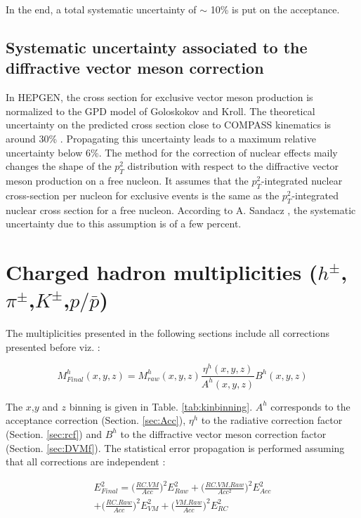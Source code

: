 In the end, a total systematic uncertainty of $\sim$ 10\% is put on the acceptance.


\subsection{Systematic uncertainty associated to the diffractive vector meson correction}

In HEPGEN, the cross section for exclusive vector meson production is normalized to the GPD model of Goloskokov and Kroll. The theoretical uncertainty on the predicted cross section close to COMPASS kinematics is around 30\% \cite{Goloskokov}. Propagating this uncertainty leads to a maximum relative uncertainty below 6\%.
The method for the correction of nuclear effects maily changes the shape of the $p_T^2$ distribution with respect to the diffractive vector meson production on a free nucleon. It assumes that the $p_T^2$-integrated nuclear cross-section per nucleon for exclusive events is the same as the $p_T^2$-integrated nuclear cross section for a free nucleon. According to A. Sandacz \cite{Hepgen}, the systematic uncertainty due to this assumption is of a few percent.


\section{Charged hadron multiplicities ($h^{\pm}$,$\pi^{\pm}$,$K^{\pm}$,$p/\bar{p}$)}

The multiplicities presented in the following sections include all corrections presented before viz. :

\begin{equation}
  	M^h_{Final}(x,y,z) = M^h_{raw}(x,y,z)\frac{\eta^h(x,y,z)}{A^h(x,y,z)}B^h(x,y,z)
\end{equation}

The $x$,$y$ and $z$ binning is given in Table. \ref{tab:kinbinning}. $A^h$ corresponds to the acceptance correction (Section. \ref{sec:Acc}), $\eta^h$ to the radiative correction factor (Section. \ref{sec:rcf}) and $B^h$ to the diffractive vector meson correction factor (Section. \ref{sec:DVMf}). The statistical error propagation is performed assuming that all corrections are independent :

\begin{equation}
\begin{split}
		E^2_{Final} = \bigg( \frac{RC.VM}{Acc} \bigg)^2 E^2_{Raw} + \bigg(\frac{RC.VM.Raw}{Acc^2} \bigg)^2 E^2_{Acc} \\
		+ \bigg(\frac{RC.Raw}{Acc} \bigg)^2 E^2_{VM} + \bigg(\frac{VM.Raw}{Acc} \bigg)^2 E^2_{RC}
\end{split}
\end{equation}


